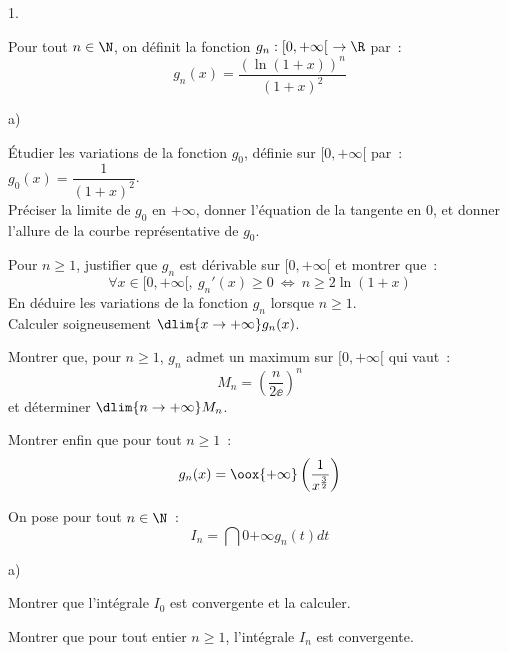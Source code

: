 \documentclass[11pt]{article}%
\begin{document}
\begin{noliste}{1.}
  \setlength{\itemsep}{2mm}
\item Pour tout $n \in \N$, on définit la fonction $g_n : [0,+\infty[
  \ \rightarrow \R$ par~:
  \[ 
  g_n(x) = \dfrac{( \ln(1+x))^n}{(1+x)^2} 
  \]

\begin{noliste}{a)}
\item Étudier les variations de la fonction $g_0$, définie sur 
$[0,+\infty[$ par~: $g_0(x) = \dfrac{1}{(1+x)^2}$.\\ 
Préciser la limite de $g_0$ en $+\infty$, donner l'équation de la 
tangente en $0$, et donner l'allure de la courbe représentative de 
$g_0$.








\item Pour $n \geq 1$, justifier que $g_n$ est dérivable sur
  $[0,+\infty[$ et montrer que~:
  \[ 
  \forall x \in [0,+\infty[, \ g_n'(x) \geq 0 \ \Leftrightarrow \ n
  \geq 2\ln(1+x)
  \]
  En déduire les variations de la fonction $g_n$ lorsque $n \geq 1$.\\ 
  Calculer soigneusement $\dlim{x \to + \infty} g_n(x)$.
  
  


\item Montrer que, pour $n \geq 1$, $g_n$ admet un maximum sur 
$[0,+\infty[$ qui vaut~:
\[ 
M_n = \left( \dfrac{n}{2 \ee} \right)^n 
\]
et déterminer $\dlim{n \to + \infty} M_n$.






\item Montrer enfin que pour tout $n \geq 1$~:
  \[
  g_n(x)  = \oox{+\infty} \left( 
    \frac{1}{x^{\frac{3}{2}}} \right) 
  \]

  
\end{noliste}


\item On pose pour tout $n \in \N$~:
\[ 
I_n = \dint{0}{+\infty} g_n(t) dt 
\]
\begin{noliste}{a)}
\item Montrer que l'intégrale $I_0$ est convergente et la calculer.






\item Montrer que pour tout entier $n \geq 1$, l'intégrale $I_n$ 
est convergente.





\end{noliste}
\end{noliste}
\end{document}
